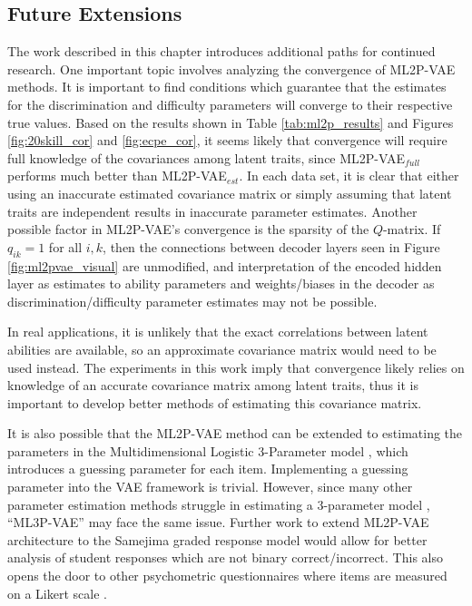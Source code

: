 \subsection{Future Extensions}
The work described in this chapter introduces additional paths for continued research. One important topic involves analyzing the convergence of ML2P-VAE methods. It is important to find conditions which guarantee that the estimates for the discrimination and difficulty parameters will converge to their respective true values. Based on the results shown in Table \ref{tab:ml2p_results} and Figures \ref{fig:20skill_cor} and \ref{fig:ecpe_cor}, it seems likely that convergence will require full knowledge of the covariances among latent traits, since ML2P-VAE$_{full}$ performs much better than ML2P-VAE$_{est}$. In each data set, it is clear that either using an inaccurate estimated covariance matrix or simply assuming that latent traits are independent results in inaccurate parameter estimates. Another possible factor in ML2P-VAE's convergence is the sparsity of the $Q$-matrix. If $q_{ik} = 1$ for all $i,k$, then the connections between decoder layers seen in Figure \ref{fig:ml2pvae_visual} are unmodified, and interpretation of the encoded hidden layer as estimates to ability parameters and weights/biases in the decoder as discrimination/difficulty parameter estimates may not be possible.

In real applications, it is unlikely that the exact correlations between latent abilities are available, so an approximate covariance matrix would need to be used instead. The experiments in this work imply that convergence likely relies on knowledge of an accurate covariance matrix among latent traits, thus it is important to develop better methods of estimating this covariance matrix.

It is also possible that the ML2P-VAE method can be extended to estimating the parameters in the Multidimensional Logistic 3-Parameter model \cite{birnbaum1968}, which introduces a guessing parameter for each item. Implementing a guessing parameter into the VAE framework is trivial. However, since many other parameter estimation methods struggle in estimating a 3-parameter model \cite{baker_kim2004}, ``ML3P-VAE'' may face the same issue. Further work to extend ML2P-VAE architecture to the Samejima graded response model \cite{samejima1997} would allow for better analysis of student responses which are not binary correct/incorrect. This also opens the door to other psychometric questionnaires where items are measured on a Likert scale \cite{likert1932}.

